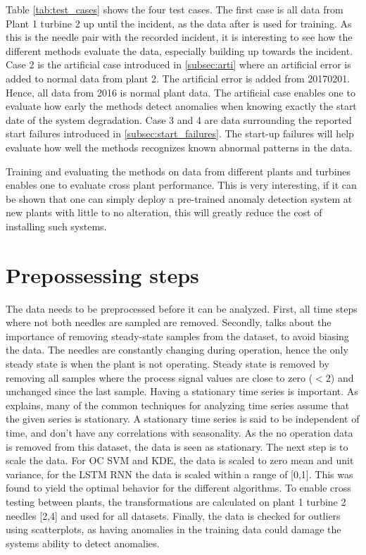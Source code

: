        Table \ref{tab:test_cases} shows the four test cases. The first case is all data from Plant 1 turbine 2 up until the incident, as the data after is used for training. As this is the needle pair with the recorded incident, it is interesting to see how the different methods evaluate the data, especially building up towards the incident. Case 2 is the artificial case introduced in \ref{subsec:arti} where an artificial error is added to normal data from plant 2. The artificial error is added from 20170201. Hence, all data from 2016 is normal plant data. The artificial case enables one to evaluate how early the methods detect anomalies when knowing exactly the start date of the system degradation. Case 3 and 4 are data surrounding the reported start failures introduced in \ref{subsec:start_failures}. The start-up failures will help evaluate how well the methods recognizes known abnormal patterns in the data. 
        
        Training and evaluating the methods on data from different plants and turbines enables one to evaluate cross plant performance. This is very interesting, if it can be shown that one can simply deploy a pre-trained anomaly detection system at new plants with little to no alteration, this will greatly reduce the cost of installing such systems. 
        
        
        
    \section{Prepossessing steps}
        The data needs to be preprocessed before it can be analyzed. First, all time steps where not both needles are sampled are removed. Secondly, \cite{Tarassenko2009} talks about the importance of removing steady-state samples from the dataset, to avoid biasing the data.  The needles are constantly changing during operation, hence the only steady state is when the plant is not operating. Steady state is removed by removing all samples where the process signal values are close to zero ($<2$) and unchanged since the last sample. Having a stationary time series is important. As \cite{Manuca1996} explains, many of the common techniques for analyzing time series assume that the given series is stationary. A stationary time series is said to be independent of time, and don't have any correlations with seasonality. As the no operation data is removed from this dataset, the data is seen as stationary. The next step is to scale the data. For OC SVM and KDE, the data is scaled to zero mean and unit variance, for the LSTM RNN the data is scaled within a range of [0,1]. This was found to yield the optimal behavior for the different algorithms. To enable cross testing between plants, the transformations are calculated on plant 1 turbine 2 needles [2,4] and used for all datasets. Finally, the data is checked for outliers using scatterplots, as having anomalies in the training data could damage the systems ability to detect anomalies. 
    
